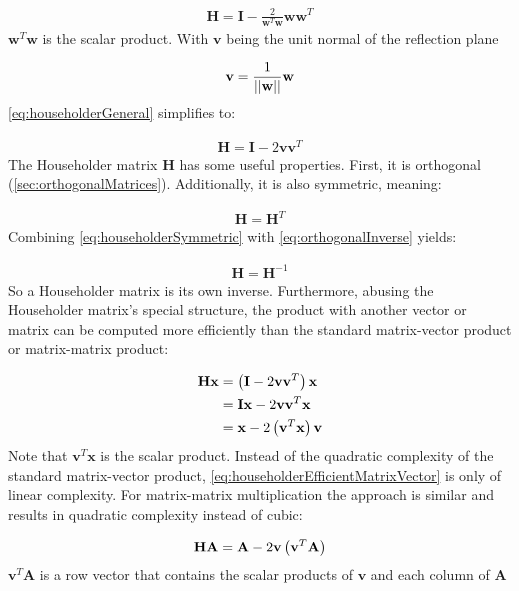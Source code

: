 \begin{align}
\label{eq:householderGeneral}
\mathbf{H} = \mathbf{I} - \frac{2}{\mathbf{w}^T\mathbf{w}}\mathbf{w}\mathbf{w}^T
\end{align}
%
$\mathbf{w}^T\mathbf{w}$ is the scalar product. With $\mathbf{v}$ being the unit normal of the reflection plane

\begin{align}
	\mathbf{v} = \frac{1}{\left\vert\left\vert\mathbf{w}\right\vert\right\vert}\mathbf{w}
\end{align}
%
\cref{eq:householderGeneral} simplifies to:

\begin{align}
\label{eq:householderUnitLength}
\mathbf{H} = \mathbf{I} - 2\mathbf{v}\mathbf{v}^T
\end{align}
%
The Householder matrix $\mathbf{H}$ has some useful properties.
First, it is orthogonal (\cref{sec:orthogonalMatrices}).
Additionally, it is also symmetric, meaning:

\begin{align}
\label{eq:householderSymmetric}
\mathbf{H} = \mathbf{H}^T
\end{align}
%
Combining \cref{eq:householderSymmetric} with \cref{eq:orthogonalInverse} yields:

\begin{align}
\label{eq:householderInverse}
\mathbf{H} = \mathbf{H}^{-1}
\end{align}
%
So a Householder matrix is its own inverse.
Furthermore, abusing the Householder matrix's special structure, the product with another vector or matrix can be computed more efficiently than the standard matrix-vector product or matrix-matrix product:

\begin{align}
\nonumber
\mathbf{H} \mathbf{x}
&= 
\left(\mathbf{I} - 2\mathbf{v}\mathbf{v}^T\right)\mathbf{x}
\\&= 
\nonumber
\mathbf{I}\mathbf{x} - 2\mathbf{v}\mathbf{v}^T\mathbf{x}
\\&= 
\label{eq:householderEfficientMatrixVector}
\mathbf{x} - 2\left(\mathbf{v}^T\mathbf{x}\right)\mathbf{v}
\end{align}
%
Note that $\mathbf{v}^T\mathbf{x}$ is the scalar product.
Instead of the quadratic complexity of the standard matrix-vector product, \cref{eq:householderEfficientMatrixVector} is only of linear complexity.
For matrix-matrix multiplication the approach is similar and results in quadratic complexity instead of cubic:

\begin{align}
\label{eq:householderEfficientMatrixMatrix}
\mathbf{H} \mathbf{A}
=
\mathbf{A} - 2\mathbf{v}\left(\mathbf{v}^T\mathbf{A}\right)
\end{align}
%
$\mathbf{v}^T\mathbf{A}$ is a row vector that contains the scalar products of $\mathbf{v}$ and each column of $\mathbf{A}$



